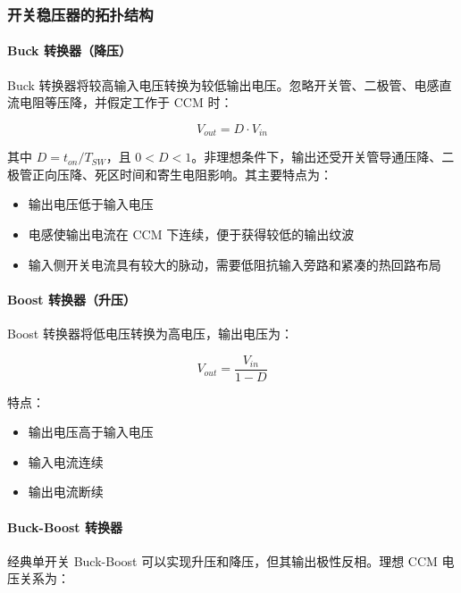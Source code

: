 \subsubsection{开关稳压器的拓扑结构}

\paragraph{Buck 转换器（降压）}

Buck 转换器将较高输入电压转换为较低输出电压。忽略开关管、二极管、电感直流电阻等压降，并假定工作于 CCM 时：

\begin{equation}
V_{out} = D \cdot V_{in} \label{eq:buck-output}
\end{equation}

其中 $D=t_{on}/T_{SW}$，且 $0<D<1$。非理想条件下，输出还受开关管导通压降、二极管正向压降、死区时间和寄生电阻影响。其主要特点为：
\begin{itemize}
  \item 输出电压低于输入电压
  \item 电感使输出电流在 CCM 下连续，便于获得较低的输出纹波
  \item 输入侧开关电流具有较大的脉动，需要低阻抗输入旁路和紧凑的热回路布局
\end{itemize}

\paragraph{Boost 转换器（升压）}

Boost 转换器将低电压转换为高电压，输出电压为：

\begin{equation}
V_{out} = \frac{V_{in}}{1 - D} \label{eq:boost-output}
\end{equation}

特点：
\begin{itemize}
  \item 输出电压高于输入电压
  \item 输入电流连续
  \item 输出电流断续
\end{itemize}

\paragraph{Buck-Boost 转换器}

经典单开关 Buck-Boost 可以实现升压和降压，但其输出极性反相。理想 CCM 电压关系为：

